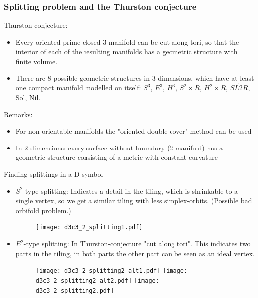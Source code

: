 \begin{frame}
  \frametitle{Splitting problem and the Thurston conjecture}
  Thurston conjecture:
  \begin{itemize}
    \item Every oriented prime closed 3-manifold can be cut along tori, so that
      the interior of each of the resulting manifolds has a geometric structure
      with finite volume.
    \item There are 8 possible geometric structures in 3 dimensions, which have
      at least one compact manifold modelled on itself: $S^3$, $E^3$,
      $H^3$, $S^2\times R$, $H^2\times R$, $\widetilde{SL2R}$, Sol,
      Nil.
  \end{itemize}
  Remarks:
  \begin{itemize}
    \item For non-orientable manifolds the "oriented double cover" method can be
      used
    \item In $2$ dimensions: every surface without boundary (2-manifold) has a
      geometric structure consisting of a metric with constant curvature
  \end{itemize}
\end{frame}

\begin{frame}
  Finding splittings in a D-symbol
  \begin{itemize}
    \item $S^2$-type splitting: Indicates a detail in the tiling, which is
      shrinkable to a single vertex, so we get a similar tiling  with less simplex-orbits. (Possible bad
      orbifold problem.) 
      \begin{figure}
	\center
	\texttt{[image: d3c3\_2\_splitting1.pdf]}
      \end{figure}
    \item $E^2$-type splitting: In Thurston-conjecture "cut along tori". This
      indicates two parts in the tiling, in both parts the other part
      can be seen as an ideal vertex. 
      \begin{figure}
	\center
	\texttt{[image: d3c3\_2\_splitting2\_alt1.pdf]}
	\hspace{0.1\textwidth}
	\texttt{[image: d3c3\_2\_splitting2\_alt2.pdf]}
	\hspace{0.1\textwidth}
	\texttt{[image: d3c3\_2\_splitting2.pdf]}
      \end{figure}
  \end{itemize}
\end{frame}

